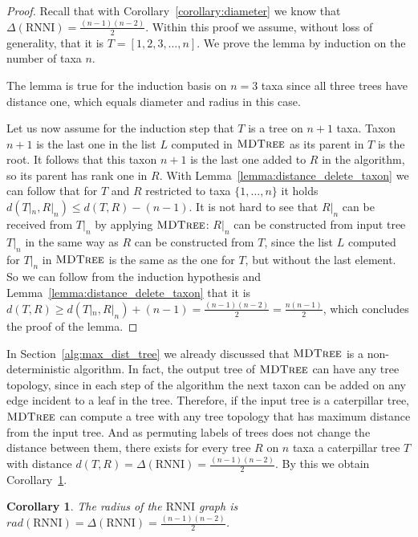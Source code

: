 \documentclass{amsart}
\newcommand{\rnni}{\mathrm{RNNI}}
\newcommand{\mdtree}{\textsc{MDTree}}
\newtheorem{corollary}[definition]{Corollary}
\begin{document}
\begin{proof}
Recall that with Corollary~\ref{corollary:diameter} we know that $\Delta(\rnni) = \frac{(n-1)(n-2)}{2}$.
Within this proof we assume, without loss of generality, that it is $T = [1,2,3,\ldots,n]$.
We prove the lemma by induction on the number of taxa $n$.

The lemma is true for the induction basis on $n=3$ taxa since all three trees have distance one, which equals diameter and radius in this case.

Let us now assume for the induction step that $T$ is a tree on $n+1$ taxa.
Taxon $n+1$ is the last one in the list $L$ computed in $\mdtree$ as its parent in $T$ is the root.
It follows that this taxon $n+1$ is the last one added to $R$ in the algorithm, so its parent has rank one in $R$.
With Lemma~\ref{lemma:distance_delete_taxon} we can follow that for $T$ and $R$ restricted to taxa $\{1, \ldots, n\}$ it holds $d(T|_n,R|_n) \leq d(T,R) - (n-1)$.
It is not hard to see that $R|_n$ can be received from $T|_n$ by applying $\mdtree$:
$R|_n$ can be constructed from input tree $T|_n$ in the same way as $R$ can be constructed from $T$, since the list $L$ computed for $T|_n$ in $\mdtree$ is the same as the one for $T$, but without the last element.
So we can follow from the induction hypothesis and Lemma~\ref{lemma:distance_delete_taxon} that it is $d(T,R) \geq d(T|_n,R|_n) + (n-1) = \frac{(n-1)(n-2)}{2} = \frac{n(n-1)}{2}$, which concludes the proof of the lemma.
\end{proof}

In Section~\ref{alg:max_dist_tree} we already discussed that $\mdtree$ is a non-deterministic algorithm.
In fact, the output tree of $\mdtree$ can have any tree topology, since in each step of the algorithm the next taxon can be added on any edge incident to a leaf in the tree.
Therefore, if the input tree is a caterpillar tree, $\mdtree$ can compute a tree with any tree topology that has maximum distance from the input tree.
And as permuting labels of trees does not change the distance between them, there exists for every tree $R$ on $n$ taxa a caterpillar tree $T$ with distance $d(T,R) = \Delta(\rnni) = \frac{(n-1)(n-2)}{2}$.
By this we obtain Corollary~\ref{corollary:radius}.

\begin{corollary}
The radius of the $\rnni$ graph is $rad(\rnni) = \Delta(\rnni) = \frac{(n-1)(n-2)}{2}$.
\label{corollary:radius}
\end{corollary}
\end{document}
